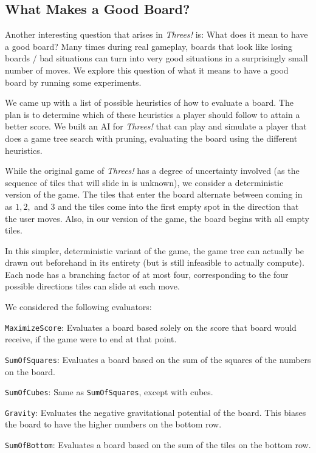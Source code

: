 \documentclass[11pt]{article}
\begin{document}
\subsection{What Makes a Good Board?}

Another interesting question that arises in \emph{Threes!} is: What does it mean to have a good board? Many times during real gameplay, boards that look like losing boards / bad situations can turn into very good situations in a surprisingly small number of moves. We explore this question of what it means to have a good board by running some experiments. 

We came up with a list of possible heuristics of how to evaluate a board. The plan is to determine which of these heuristics a player should follow to attain a better score. We built an AI for \emph{Threes!} that can play and simulate a player that does a game tree search with pruning, evaluating the board using the different heuristics. 

While the original game of \emph{Threes!} has a degree of uncertainty involved (as the sequence of tiles that will slide in is unknown), we consider a deterministic version of the game. The tiles that enter the board alternate between coming in as $1, 2,$ and $3$ and the tiles come into the first empty spot in the direction that the user moves. Also, in our version of the game, the board begins with all empty tiles.

In this simpler, deterministic variant of the game, the game tree can actually be drawn out beforehand in its entirety (but is still infeasible to actually compute). Each node has a branching factor of at most four, corresponding to the four possible directions tiles can slide at each move.

We considered the following evaluators:

\texttt{MaximizeScore}: Evaluates a board based solely on the score that board would receive, if the game were to end at that point.

\texttt{SumOfSquares}: Evaluates a board based on the sum of the squares of the numbers on the board.

\texttt{SumOfCubes}: Same as \texttt{SumOfSquares}, except with cubes.

\texttt{Gravity}: Evaluates the negative gravitational potential of the board. This biases the board to have the higher numbers on the bottom row.

\texttt{SumOfBottom}: Evaluates a board based on the sum of the tiles on the bottom row.
\end{document}
